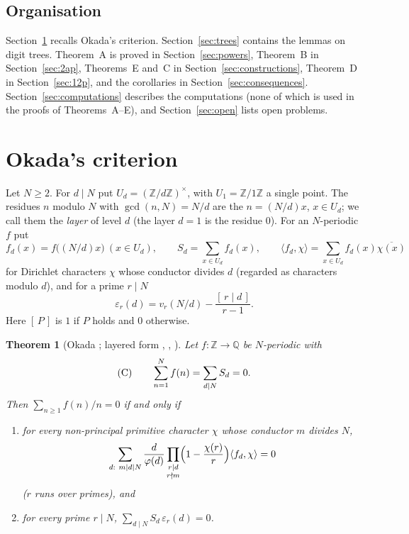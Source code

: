 \documentclass[11pt,a4paper]{article}
\newtheorem{theorem}{Theorem}[section]
\theoremstyle{definition}
\theoremstyle{remark}
\newcommand{\Q}{\mathbb{Q}}
\newcommand{\Z}{\mathbb{Z}}
\newcommand{\ip}[2]{\langle #1,#2\rangle}
\begin{document}
\subsection{Organisation}
Section~\ref{sec:okada} recalls Okada's criterion. Section~\ref{sec:trees} contains the lemmas on digit trees. Theorem~A is proved in Section~\ref{sec:powers}, Theorem~B in Section~\ref{sec:2ap}, Theorems~E and~C in Section~\ref{sec:constructions}, Theorem~D in Section~\ref{sec:12p}, and the corollaries in Section~\ref{sec:consequences}. Section~\ref{sec:computations} describes the computations (none of which is used in the proofs of Theorems~A--E), and Section~\ref{sec:open} lists open problems.

\section{Okada's criterion}\label{sec:okada}

Let $N\ge2$. For $d\mid N$ put $U_d=(\Z/d\Z)^\times$, with $U_1=\Z/1\Z$ a single point. The residues $n$ modulo $N$ with $\gcd(n,N)=N/d$ are the $n=(N/d)x$, $x\in U_d$; we call them the \emph{layer} of level $d$ (the layer $d=1$ is the residue $0$). For an $N$-periodic $f$ put
\[
f_d(x)=f\bigl((N/d)x\bigr)\ (x\in U_d),\qquad S_d=\sum_{x\in U_d}f_d(x),\qquad \ip{f_d}{\chi}=\sum_{x\in U_d}f_d(x)\overline{\chi(x)}
\]
for Dirichlet characters $\chi$ whose conductor divides $d$ (regarded as characters modulo $d$), and for a prime $r\mid N$
\[
\varepsilon_r(d)=v_r(N/d)-\frac{[\,r\mid d\,]}{r-1}.
\]
Here $[\,P\,]$ is $1$ if $P$ holds and $0$ otherwise.

\begin{theorem}[Okada \cite{Oka82}; layered form {\cite[Thm.~4]{Bha22}}, {\cite[Thm.~2.2]{Kei26a}}, {\cite[Thm.~2.1 and Sect.~6]{Kei26c}}]\label{thm:okada}
Let $f\colon\Z\to\Q$ be $N$-periodic with
\[
\textup{(C)}\qquad \sum_{n=1}^Nf(n)=\sum_{d\mid N}S_d=0 .
\]
Then $\sum_{n\ge1}f(n)/n=0$ if and only if
\begin{enumerate}
\item[\textup{(A)}] for every non-principal primitive character $\chi$ whose conductor $m$ divides $N$,
\[
\sum_{d:\ m\mid d\mid N}\frac{d}{\varphi(d)}\prod_{\substack{r\mid d\\ r\nmid m}}\Bigl(1-\frac{\chi(r)}{r}\Bigr)\ip{f_d}{\chi}=0
\]
\textup{(}$r$ runs over primes\textup{)}, and
\item[\textup{(B)}] for every prime $r\mid N$, $\sum_{d\mid N}S_d\,\varepsilon_r(d)=0$.
\end{enumerate}
\end{theorem}
\end{document}
